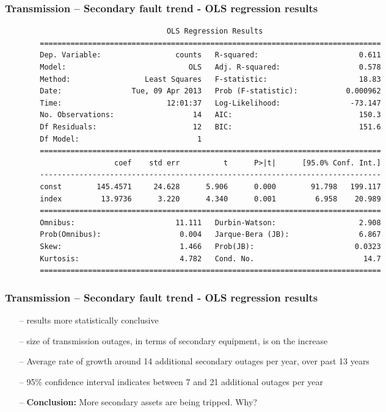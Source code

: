 \documentclass[aspectratio=169]{beamer}
\begin{document}
\begin{frame}[fragile]
  \frametitle{Transmission -- Secondary fault trend - OLS regression results}
\scriptsize
\begin{verbatim}
                                     OLS Regression Results                            
        ==============================================================================
        Dep. Variable:                 counts   R-squared:                       0.611
        Model:                            OLS   Adj. R-squared:                  0.578
        Method:                 Least Squares   F-statistic:                     18.83
        Date:                Tue, 09 Apr 2013   Prob (F-statistic):           0.000962
        Time:                        12:01:37   Log-Likelihood:                -73.147
        No. Observations:                  14   AIC:                             150.3
        Df Residuals:                      12   BIC:                             151.6
        Df Model:                           1                                         
        ==============================================================================
                         coef    std err          t      P>|t|      [95.0% Conf. Int.]
        ------------------------------------------------------------------------------
        const        145.4571     24.628      5.906      0.000        91.798   199.117
        index         13.9736      3.220      4.340      0.001         6.958    20.989
        ==============================================================================
        Omnibus:                       11.111   Durbin-Watson:                   2.908
        Prob(Omnibus):                  0.004   Jarque-Bera (JB):                6.867
        Skew:                           1.466   Prob(JB):                       0.0323
        Kurtosis:                       4.782   Cond. No.                         14.7
        ==============================================================================
\end{verbatim}
\end{frame}

\begin{frame}[fragile]
  \frametitle{Transmission -- Secondary fault trend - OLS regression results}

\begin{itemize}
   \item[--] results more statistically conclusive 
   \item[--] size of transmission outages, in terms of secondary equipment, is on the increase
   \item[--] Average rate of growth around 14 additional secondary outages per year, over past 13 years
   \item[--] 95\% confidence interval indicates between 7 and 21 additional outages per year
   \item[--] \textbf{Conclusion:} More secondary assets are being tripped.  Why? 
\end{itemize}
\end{frame}
\end{document}
